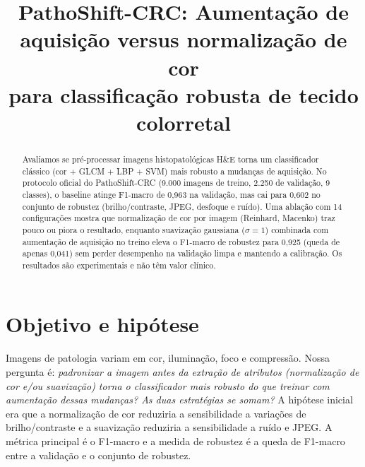 \documentclass[10pt,conference]{IEEEtran}
\begin{document}
\title{PathoShift-CRC: Aumentação de aquisição versus normalização de cor\\para classificação robusta de tecido colorretal}

\author{
}

\maketitle

\begin{abstract}
Avaliamos se pré-processar imagens histopatológicas H\&E torna um classificador clássico (cor + GLCM + LBP + SVM) mais robusto a mudanças de aquisição. No protocolo oficial do PathoShift-CRC (9.000 imagens de treino, 2.250 de validação, 9 classes), o baseline atinge F1-macro de 0,963 na validação, mas cai para 0,602 no conjunto de robustez (brilho/contraste, JPEG, desfoque e ruído). Uma ablação com 14 configurações mostra que normalização de cor por imagem (Reinhard, Macenko) traz pouco ou piora o resultado, enquanto suavização gaussiana ($\sigma{=}1$) combinada com aumentação de aquisição no treino eleva o F1-macro de robustez para 0,925 (queda de apenas 0,041) sem perder desempenho na validação limpa e mantendo a calibração. Os resultados são experimentais e não têm valor clínico.
\end{abstract}

\section{Objetivo e hipótese}
Imagens de patologia variam em cor, iluminação, foco e compressão. Nossa pergunta é: \emph{padronizar a imagem antes da extração de atributos (normalização de cor e/ou suavização) torna o classificador mais robusto do que treinar com aumentação dessas mudanças? As duas estratégias se somam?} A hipótese inicial era que a normalização de cor reduziria a sensibilidade a variações de brilho/contraste e a suavização reduziria a sensibilidade a ruído e JPEG. A métrica principal é o F1-macro e a medida de robustez é a queda de F1-macro entre a validação e o conjunto de robustez.

\end{document}
